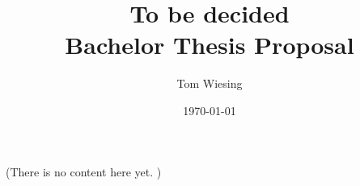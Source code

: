 \documentclass[12pt]{article}
\title{To be decided\\Bachelor Thesis Proposal}
\author{Tom Wiesing}
\date{\today}
\begin{document}
\maketitle
\newpage
\tableofcontents
(There is no content here yet. )
\end{document}
